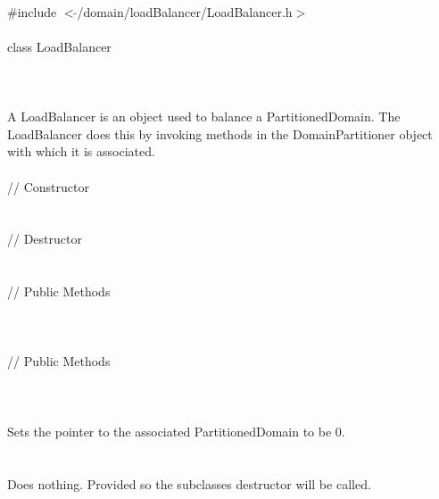 
   \\
\indent \#include $<\tilde{ }$/domain/loadBalancer/LoadBalancer.h$>$  \\

  \\
\indent class LoadBalancer \\

 \\
 \\


  \\
\indent A LoadBalancer is an object used to balance a
PartitionedDomain. The LoadBalancer does this by invoking methods in
the DomainPartitioner object with which it is associated. \\

  \\
\indent\indent  // Constructor  \\
\indent{}\\ \\
\indent\indent // Destructor  \\
\indent{}  \\ \\
\indent\indent // Public Methods  \\
\indent{} \\ 
\indent{} \\ \\
\indent\indent // Public Methods  \\
\indent{}\\


\\
\\ 
Sets the pointer to the associated PartitionedDomain to be $0$. \\

 \\
  \\ 
Does nothing. Provided so the subclasses destructor will be called. \\

